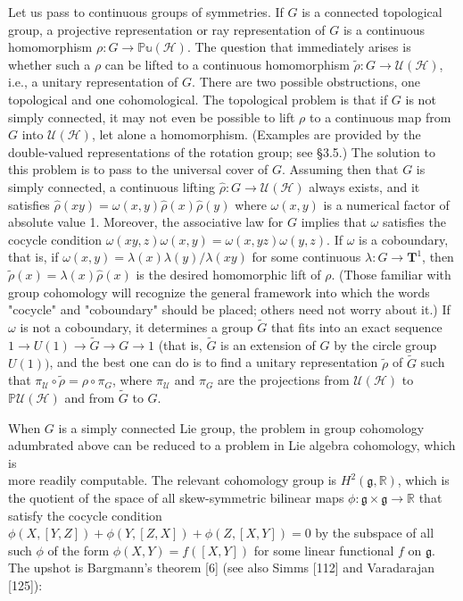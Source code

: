 \documentclass[10pt, letterpaper]{article}
\begin{document}
Let us pass to continuous groups of symmetries. If $G$ is a connected topological group, a projective representation or ray representation of $G$ is a continuous homomorphism $\rho: G \rightarrow \mathbb{P u}(\mathcal{H})$. The question that immediately arises is whether such a $\rho$ can be lifted to a continuous homomorphism $\widetilde{\rho}: G \rightarrow \mathcal{U}(\mathcal{H})$, i.e., a unitary representation of $G$. There are two possible obstructions, one topological and one cohomological. The topological problem is that if $G$ is not simply connected, it may not even be possible to lift $\rho$ to a continuous map from $G$ into $\mathcal{U}(\mathcal{H})$, let alone a homomorphism. (Examples are provided by the double-valued representations of the rotation group; see §3.5.) The solution to this problem is to pass to the universal cover of $G$. Assuming then that $G$ is simply connected, a continuous lifting $\widehat{\rho}: G \rightarrow \mathcal{U}(\mathcal{H})$ always exists, and it satisfies $\widehat{\rho}(x y)=\omega(x, y) \widehat{\rho}(x) \widehat{\rho}(y)$ where $\omega(x, y)$ is a numerical factor of absolute value 1. Moreover, the associative law for $G$ implies that $\omega$ satisfies the cocycle condition $\omega(x y, z) \omega(x, y)=\omega(x, y z) \omega(y, z)$. If $\omega$ is a coboundary, that is, if $\omega(x, y)=\lambda(x) \lambda(y) / \lambda(x y)$ for some continuous $\lambda: G \rightarrow \mathbf{T}^{1}$, then $\widetilde{\rho}(x)=\lambda(x) \widehat{\rho}(x)$ is the desired homomorphic lift of $\rho$. (Those familiar with group cohomology will recognize the general framework into which the words "cocycle" and "coboundary" should be placed; others need not worry about it.) If $\omega$ is not a coboundary, it determines a group $\widetilde{G}$ that fits into an exact sequence $1 \rightarrow U(1) \rightarrow \widetilde{G} \rightarrow G \rightarrow 1$ (that is, $\widetilde{G}$ is an extension of $G$ by the circle group $U(1))$, and the best one can do is to find a unitary representation $\widetilde{\rho}$ of $\widetilde{G}$ such that $\pi_{\mathcal{U}} \circ \widetilde{\rho}=\rho \circ \pi_{G}$, where $\pi_{\mathcal{U}}$ and $\pi_{G}$ are the projections from $\mathcal{U}(\mathcal{H})$ to $\mathbb{P} \mathcal{U}(\mathcal{H})$ and from $\widetilde{G}$ to $G$.

When $G$ is a simply connected Lie group, the problem in group cohomology adumbrated above can be reduced to a problem in Lie algebra cohomology, which is\\
more readily computable. The relevant cohomology group is $H^{2}(\mathfrak{g}, \mathbb{R})$, which is the quotient of the space of all skew-symmetric bilinear maps $\phi: \mathfrak{g} \times \mathfrak{g} \rightarrow \mathbb{R}$ that satisfy the cocycle condition $\phi(X,[Y, Z])+\phi(Y,[Z, X])+\phi(Z,[X, Y])=0$ by the subspace of all such $\phi$ of the form $\phi(X, Y)=f([X, Y])$ for some linear functional $f$ on $\mathfrak{g}$. The upshot is Bargmann's theorem [6] (see also Simms [112] and Varadarajan [125]):
\end{document}
